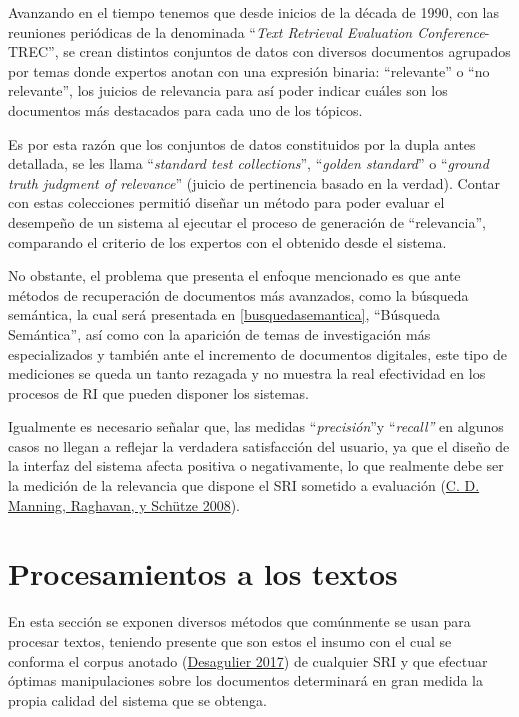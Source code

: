 \documentclass[
  12pt,
  openany]{book}
\begin{document}
Avanzando en el tiempo tenemos que desde inicios de la década de 1990, con las reuniones periódicas de la denominada ``\emph{Text Retrieval Evaluation Conference}-TREC'', se crean distintos conjuntos de datos con diversos documentos agrupados por temas donde expertos anotan con una expresión binaria: ``relevante'' o ``no relevante'', los juicios de relevancia para así poder indicar cuáles son los documentos más destacados para cada uno de los tópicos.

Es por esta razón que los conjuntos de datos constituidos por la dupla antes detallada, se les llama ``\emph{standard test collections}'', ``\emph{golden standard}'' o ``\emph{ground truth judgment of relevance}'' (juicio de pertinencia basado en la verdad). Contar con estas colecciones permitió diseñar un método para poder evaluar el desempeño de un sistema al ejecutar el proceso de generación de ``relevancia'', comparando el criterio de los expertos con el obtenido desde el sistema.

No obstante, el problema que presenta el enfoque mencionado es que ante métodos de recuperación de documentos más avanzados, como la búsqueda semántica, la cual será presentada en \ref{busquedasemantica}, ``Búsqueda Semántica'', así como con la aparición de temas de investigación más especializados y también ante el incremento de documentos digitales, este tipo de mediciones se queda un tanto rezagada y no muestra la real efectividad en los procesos de RI que pueden disponer los sistemas.

Igualmente es necesario señalar que, las medidas ``\emph{precisión}''y ``\emph{recall''} en algunos casos no llegan a reflejar la verdadera satisfacción del usuario, ya que el diseño de la interfaz del sistema afecta positiva o negativamente, lo que realmente debe ser la medición de la relevancia que dispone el SRI sometido a evaluación (\protect\hyperlink{ref-manning2008}{C. D. Manning, Raghavan, y Schütze 2008}).

\hypertarget{PT}{%
\section{Procesamientos a los textos}\label{PT}}

En esta sección se exponen diversos métodos que comúnmente se usan para procesar textos, teniendo presente que son estos el insumo con el cual se conforma el corpus anotado (\protect\hyperlink{ref-desagulier2017}{Desagulier 2017}) de cualquier SRI y que efectuar óptimas manipulaciones sobre los documentos determinará en gran medida la propia calidad del sistema que se obtenga.
\end{document}
